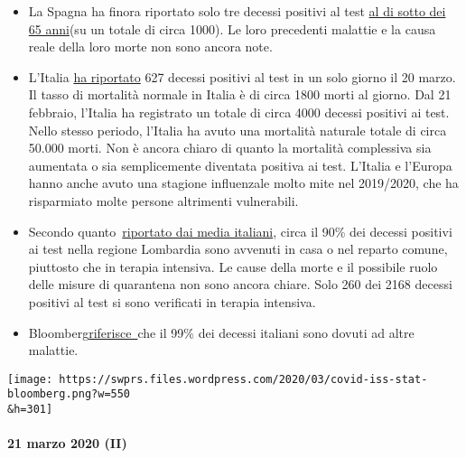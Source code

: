 \begin{itemize}
\tightlist
\item
  La Spagna ha finora riportato solo tre decessi positivi al test
  \href{https://www.20minutos.es/noticia/4193883/0/media-edad-coronavirus-espana/}{al
  di sotto dei 65 anni}(su un totale di circa 1000). Le loro precedenti
  malattie e la causa reale della loro morte non sono ancora note.
\item
  L'Italia
  \href{https://www.msn.com/en-au/news/coronavirus/italy-coronavirus-deaths-surge-by-627-in-a-day-lifting-total-death-toll-to-4032/ar-BB11tDnS}{ha
  riportato} 627 decessi positivi al test in un solo giorno il 20 marzo.
  Il tasso di mortalità normale in Italia è di circa 1800 morti al
  giorno. Dal 21 febbraio, l'Italia ha registrato un totale di circa
  4000 decessi positivi ai test. Nello stesso periodo, l'Italia ha avuto
  una mortalità naturale totale di circa 50.000 morti. Non è ancora
  chiaro di quanto la mortalità complessiva sia aumentata o sia
  semplicemente diventata positiva ai test. L'Italia e l'Europa hanno
  anche avuto una stagione influenzale molto mite nel 2019/2020, che ha
  risparmiato molte persone altrimenti vulnerabili.
\item
  Secondo
  quanto~\href{https://www.tgcom24.mediaset.it/cronaca/coronavirus-in-lombardia-9-morti-su-10-mai-giunti-in-terapia-intensiva_16362350-202002a.shtml}{riportato
  dai media italiani}, circa il 90\% dei decessi positivi ai test nella
  regione Lombardia sono avvenuti in casa o nel reparto comune,
  piuttosto che in terapia intensiva. Le cause della morte e il
  possibile ruolo delle misure di quarantena non sono ancora chiare.
  Solo 260 dei 2168 decessi positivi al test si sono verificati in
  terapia intensiva.
\item
  Bloomberg\href{https://www.bloomberg.com/news/articles/2020-03-18/99-of-those-who-died-from-virus-had-other-illness-italy-says}{riferisce~}che
  il 99\% dei decessi italiani sono dovuti ad altre malattie.
\end{itemize}

\texttt{[image: https://swprs.files.wordpress.com/2020/03/covid-iss-stat-bloomberg.png?w=550\\\&h=301]}

\hypertarget{21-marzo-2020-ii}{%
\paragraph{21 marzo 2020 (II)}\label{21-marzo-2020-ii}}

